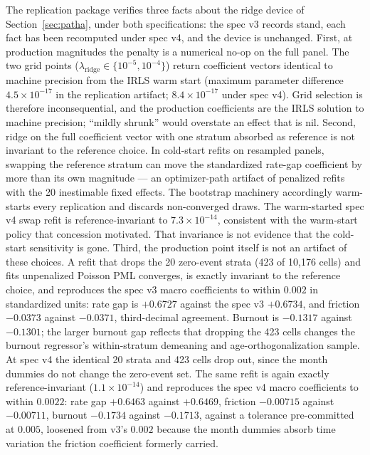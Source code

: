 \documentclass[12pt]{article}
\begin{document}
The replication package verifies three facts about the ridge device of Section~\ref{sec:patha}, under both specifications: the spec v3 records stand, each fact has been recomputed under spec v4, and the device is unchanged. First, at production magnitudes the penalty is a numerical no-op on the full panel. The two grid points ($\lambda_{\mathrm{ridge}} \in \{10^{-5}, 10^{-4}\}$) return coefficient vectors identical to machine precision from the IRLS warm start (maximum parameter difference $4.5\times10^{-17}$ in the replication artifact; $8.4\times10^{-17}$ under spec v4). Grid selection is therefore inconsequential, and the production coefficients are the IRLS solution to machine precision; ``mildly shrunk'' would overstate an effect that is nil. Second, ridge on the full coefficient vector with one stratum absorbed as reference is not invariant to the reference choice. In cold-start refits on resampled panels, swapping the reference stratum can move the standardized rate-gap coefficient by more than its own magnitude --- an optimizer-path artifact of penalized refits with the 20 inestimable fixed effects. The bootstrap machinery accordingly warm-starts every replication and discards non-converged draws. The warm-started spec v4 swap refit is reference-invariant to $7.3\times10^{-14}$, consistent with the warm-start policy that concession motivated. That invariance is not evidence that the cold-start sensitivity is gone. Third, the production point itself is not an artifact of these choices. A refit that drops the 20 zero-event strata (423 of 10,176 cells) and fits unpenalized Poisson PML converges, is exactly invariant to the reference choice, and reproduces the spec v3 macro coefficients to within $0.002$ in standardized units: rate gap is $+0.6727$ against the spec v3 $+0.6734$, and friction $-0.0373$ against $-0.0371$, third-decimal agreement. Burnout is $-0.1317$ against $-0.1301$; the larger burnout gap reflects that dropping the 423 cells changes the burnout regressor's within-stratum demeaning and age-orthogonalization sample. At spec v4 the identical 20 strata and 423 cells drop out, since the month dummies do not change the zero-event set. The same refit is again exactly reference-invariant ($1.1\times10^{-14}$) and reproduces the spec v4 macro coefficients to within $0.0022$: rate gap $+0.6463$ against $+0.6469$, friction $-0.00715$ against $-0.00711$, burnout $-0.1734$ against $-0.1713$, against a tolerance pre-committed at $0.005$, loosened from v3's $0.002$ because the month dummies absorb time variation the friction coefficient formerly carried.
\end{document}
